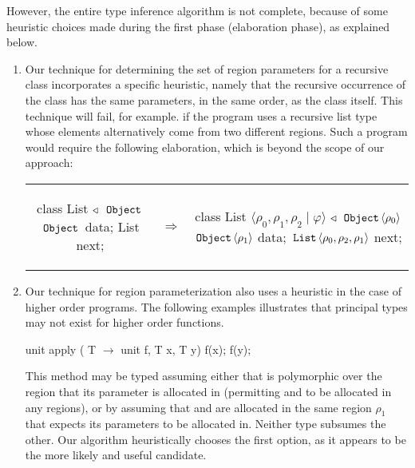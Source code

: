 However, the entire type inference algorithm is not complete, because of some heuristic
choices made during the first phase (elaboration phase), as explained below.

\begin{enumerate}
\item Our technique for determining the set of region parameters for a recursive class
incorporates a specific heuristic, namely that the recursive occurrence of the class has
the same parameters, in the same order, as the class itself. This technique will fail, for
example. if the program uses a recursive list type whose elements alternatively come
from two different regions. Such a program would require the following elaboration,
which is beyond the scope of our approach:
\begin{tabular}{ccc}
\begin{minipage}{0.3\linewidth}
\begin{codejava}
class List
  $\triangleleft$ $\,{\tt Object}\,$
{
  $\,{\tt Object}\,$ data;
  List next;
}
\end{codejava}
\end{minipage}
&
$\Rightarrow$
&
\begin{minipage}{0.5\linewidth}
\begin{codejava}
class List $\langle \rho_0, \rho_1, \rho_2 \; | \; \varphi \rangle$
  $\triangleleft$ $\,{\tt Object}\, \langle \rho_0 \rangle$
{
  $\,{\tt Object}\, \langle \rho_1 \rangle$ data;
  $\,{\tt List}\, \langle \rho_0, \rho_2, \rho_1 \rangle$ next;
}
\end{codejava}
\end{minipage}
\end{tabular}

\item Our technique for region parameterization also uses a heuristic in the case of
higher order programs. The following examples illustrates that principal types may
not exist for higher order functions.
\begin{codejava}
unit apply ( T $\rightarrow$ unit f, T x, T y) {
   f(x); f(y);
}
\end{codejava}
This method may be typed assuming either that  is polymorphic over the region
that its parameter is allocated in (permitting  and  to be allocated in any
regions), or by assuming that  and  are allocated in the same region $\rho_1$
that  expects its parameters to be allocated in. Neither type subsumes the other.
Our algorithm heuristically chooses the first option, as it appears to be the more likely
and useful candidate.


\end{enumerate}

